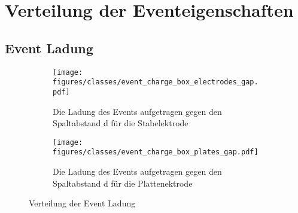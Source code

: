 \section{Verteilung der Eventeigenschaften}
\label{sec:event_value_distribution}

\subsection{Event Ladung}
\label{sec:event_charge}

\begin{figure}[H]
  \centering
  \begin{subfigure}[t]{0.48\textwidth}
    \centering
    \texttt{[image: figures/classes/event\_charge\_box\_electrodes\_gap.pdf]}
    \caption{Die Ladung des Events aufgetragen gegen den Spaltabstand d für die Stabelektrode}
    \label{fig:box-gap-event_charge-stab}
  \end{subfigure}
  \begin{subfigure}[t]{0.48\textwidth}
    \centering
    \texttt{[image: figures/classes/event\_charge\_box\_plates\_gap.pdf]}
    \caption{Die Ladung des Events aufgetragen gegen den Spaltabstand d für die Plattenektrode}
    \label{fig:box-gap-event_charge-plate}
  \end{subfigure}
  \caption{Verteilung der Event Ladung}
  \label{fig:box-gap-event_charge}
\end{figure}





